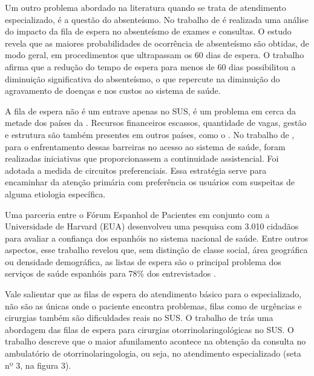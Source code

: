     Um outro problema abordado na literatura quando se trata de atendimento especializado, é a questão do absenteísmo. No trabalho de  é realizada uma análise do impacto da fila de espera no absenteísmo de exames e consultas. O estudo revela que as maiores
    probabilidades de ocorrência de absenteísmo são obtidas, de modo geral, em
    procedimentos que ultrapassam os 60 dias de espera. O trabalho afirma que a redução do tempo de espera para menos de 60 dias possibilitou a diminuição significativa do absenteísmo, o que repercute na diminuição do agravamento de doenças e nos custos ao sistema de saúde. 
    
    A fila de espera não é um entrave apenas no SUS, é um problema em cerca da metade dos países da   \cite{SICILIANI2004}. Recursos financeiros escassos, quantidade de vagas, gestão e estrutura são também presentes em outros países, como o . No trabalho de , para o enfrentamento dessas barreiras no acesso ao sistema de saúde, foram realizadas iniciativas que proporcionassem a continuidade assistencial. Foi adotada a medida de circuitos preferenciais. Essa estratégia serve para encaminhar da atenção primária com preferência os usuários com suspeitas de alguma etiologia específica.
    
    Uma parceria entre o Fórum Espanhol de Pacientes em conjunto com a Universidade de Harvard (EUA) desenvolveu uma pesquisa com 3.010 cidadãos para avaliar a confiança dos espanhóis no sistema nacional de saúde. Entre outros aspectos, esse trabalho revelou que, sem distinção de classe social, área geográfica ou densidade demográfica, as listas de espera são o principal problema dos serviços de saúde espanhóis para 78\% dos entrevistados \cite{LOPEZ2007}.
    
    Vale salientar que as filas de espera do atendimento básico para o especializado, não são as únicas onde o paciente encontra problemas, filas como de urgências e cirurgias também são dificuldades reais no SUS. O trabalho de  trás uma abordagem das filas de espera para cirurgias otorrinolaringológicas no SUS. O trabalho descreve que o maior afunilamento acontece na obtenção da consulta no ambulatório de otorrinolaringologia, ou seja, no atendimento especializado (seta nº 3, na figura 3).
    
